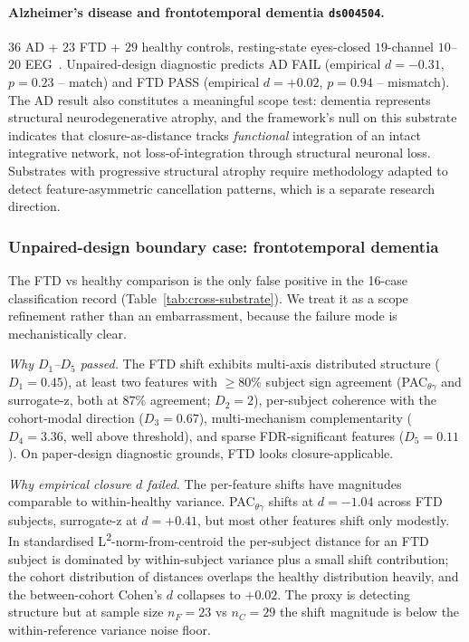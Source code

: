 \documentclass[11pt,a4paper]{article}
\begin{document}
\paragraph{Alzheimer's disease and frontotemporal dementia \texttt{ds004504}.} $36$ AD + $23$ FTD + $29$ healthy controls, resting-state eyes-closed $19$-channel $10$--$20$ EEG~\citep{MiltiadousDementia2023}. Unpaired-design diagnostic predicts AD FAIL (empirical $d = -0.31$, $p = 0.23$ -- match) and FTD PASS (empirical $d = +0.02$, $p = 0.94$ -- mismatch). The AD result also constitutes a meaningful scope test: dementia represents structural neurodegenerative atrophy, and the framework's null on this substrate indicates that closure-as-distance tracks \emph{functional} integration of an intact integrative network, not loss-of-integration through structural neuronal loss. Substrates with progressive structural atrophy require methodology adapted to detect feature-asymmetric cancellation patterns, which is a separate research direction.

\subsubsection*{Unpaired-design boundary case: frontotemporal dementia}\label{sec:ftd-boundary}

The FTD vs healthy comparison is the only false positive in the 16-case classification record (Table~\ref{tab:cross-substrate}). We treat it as a scope refinement rather than an embarrassment, because the failure mode is mechanistically clear.

\noindent\emph{Why $D_1$--$D_5$ passed.} The FTD shift exhibits multi-axis distributed structure ($D_1 = 0.45$), at least two features with $\geq 80\%$ subject sign agreement (PAC$_{\theta\gamma}$ and surrogate-z, both at $87\%$ agreement; $D_2 = 2$), per-subject coherence with the cohort-modal direction ($D_3 = 0.67$), multi-mechanism complementarity ($D_4 = 3.36$, well above threshold), and sparse FDR-significant features ($D_5 = 0.11$). On paper-design diagnostic grounds, FTD looks closure-applicable.

\noindent\emph{Why empirical closure $d$ failed.} The per-feature shifts have magnitudes comparable to within-healthy variance. PAC$_{\theta\gamma}$ shifts at $d = -1.04$ across FTD subjects, surrogate-z at $d = +0.41$, but most other features shift only modestly. In standardised L\textsuperscript{2}-norm-from-centroid the per-subject distance for an FTD subject is dominated by within-subject variance plus a small shift contribution; the cohort distribution of distances overlaps the healthy distribution heavily, and the between-cohort Cohen's $d$ collapses to $+0.02$. The proxy is detecting structure but at sample size $n_F = 23$ vs $n_C = 29$ the shift magnitude is below the within-reference variance noise floor.
\end{document}
